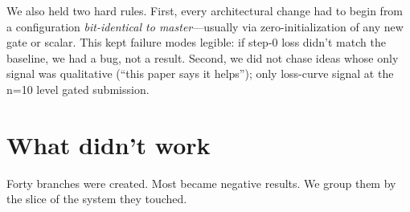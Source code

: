 \documentclass[10pt,letterpaper]{article}
\begin{document}
We also held two hard rules. First, every architectural change had to begin from a configuration \emph{bit-identical to master}---usually via zero-initialization of any new gate or scalar. This kept failure modes legible: if step-0 loss didn't match the baseline, we had a bug, not a result. Second, we did not chase ideas whose only signal was qualitative (``this paper says it helps''); only loss-curve signal at the n=10 level gated submission.

\section{What didn't work}
\label{sec:fail}

Forty branches were created. Most became negative results. We group them by the slice of the system they touched.
\end{document}
